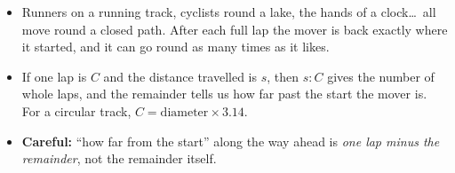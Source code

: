 \begin{knowbox}\begin{itemize}[leftmargin=1.4em,itemsep=3pt]
\item Runners on a running track, cyclists round a lake, the hands of a clock\ldots\ all move round a closed path. After each full lap the mover is back exactly where it started, and it can go round as many times as it likes.
\item If one lap is $C$ and the distance travelled is $s$, then $s:C$ gives the number of whole laps, and the remainder tells us how far past the start the mover is.
For a circular track, $C=\text{diameter}\times3.14$.
\item \textbf{Careful:} ``how far from the start'' along the way ahead is \emph{one lap minus the remainder}, not the remainder itself.
\end{itemize}\end{knowbox}
\gap
{}
